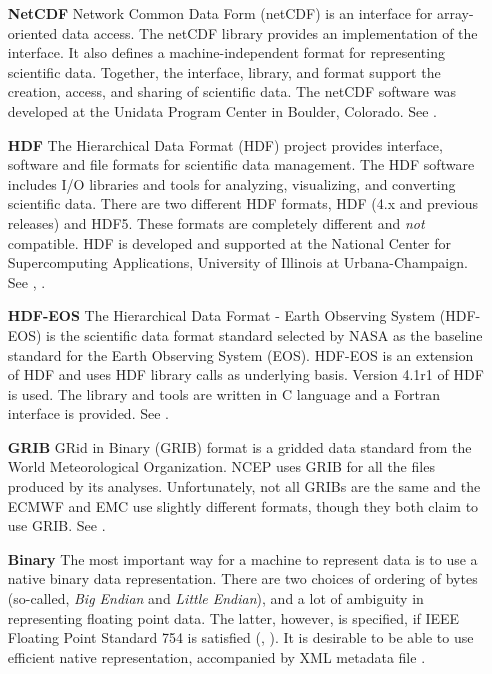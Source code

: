 \begin{itemize}
\item[\bf NetCDF] Network Common Data Form (netCDF) is an interface for 
array-oriented data access. The netCDF library provides an
implementation of the interface. It also defines a 
machine-independent format for representing scientific data. Together,
the interface, library, and format support the creation, access, and
sharing of scientific data. The netCDF software was developed at the
Unidata Program Center in Boulder, Colorado. See \cite{NetCDF3_UsersGuide_C}.

\item[\bf HDF] The Hierarchical Data Format (HDF) project provides
interface,  software and file formats for scientific data management. 
The HDF software includes I/O libraries and tools for analyzing,
visualizing, and converting scientific data. There are two different
HDF formats, HDF (4.x and previous releases) and HDF5. These formats
are completely different and {\it not} compatible. HDF is developed
and supported at the National Center for Supercomputing Applications,
University of Illinois at Urbana-Champaign. See
\cite{HDF4_tutorials}, \cite{HDF5_tutorial}.

\item[\bf HDF-EOS]  The Hierarchical Data Format - Earth Observing
System (HDF-EOS) is the scientific data format standard selected by
NASA as the baseline standard for the Earth Observing System (EOS). HDF-EOS
is an extension of HDF and uses HDF library calls as underlying
basis. Version 4.1r1 of HDF is used. The library and tools are written
in C language and a Fortran interface is provided. See \cite{HDF-EOS}.

\item[\bf GRIB] GRid in Binary (GRIB) format is a gridded data
standard from the World Meteorological Organization. NCEP uses GRIB
for all the files produced by its analyses. Unfortunately, not all
GRIBs are the same and the ECMWF and EMC use slightly different
formats, though they both claim to use GRIB. See \cite{GRIB_1}.


\item[\bf Binary]
The most important way for a machine to represent data is to use a
native binary data representation. There are  two choices of ordering of 
bytes (so-called, {\it Big Endian} and {\it Little Endian}), and a lot of
ambiguity in representing floating point data. The latter, however, is
specified, if IEEE Floating Point Standard 754 is satisfied 
(\cite{IEEE-Floating-Point}, \cite{Kahan-IEEE-754}). It is
desirable to be able to use efficient native representation,
accompanied by XML metadata file \cite{XML-W3C}. 
\end{itemize}


